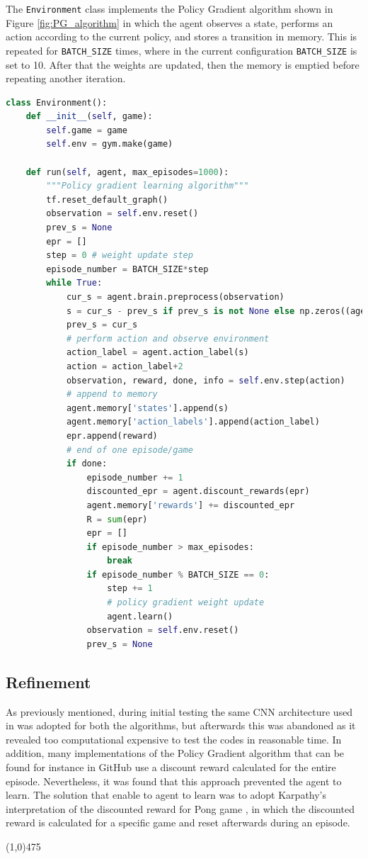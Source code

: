 \documentclass[a4paper, 11pt]{article}
\newcommand{\hl}{\begin{center} \line(1,0){475} \end{center}} %
\begin{document}
The \texttt{Environment} class implements the Policy Gradient algorithm shown in Figure \ref{fig:PG_algorithm} in which the agent observes a state, performs an action according to the current policy, and stores a transition in memory. This is repeated for \texttt{BATCH\_SIZE} times, where in the current configuration \texttt{BATCH\_SIZE} is set to 10. After that the weights are updated, then the memory is emptied before repeating another iteration.
\begin{lstlisting}[language=Python, caption=Policy Gradient Brain definition, label={lst:PG-brain}]
class Environment():
    def __init__(self, game):
        self.game = game
        self.env = gym.make(game)
        
    def run(self, agent, max_episodes=1000):
        """Policy gradient learning algorithm"""
        tf.reset_default_graph()
        observation = self.env.reset()
        prev_s = None
        epr = []
        step = 0 # weight update step
        episode_number = BATCH_SIZE*step       
        while True:            
            cur_s = agent.brain.preprocess(observation)
            s = cur_s - prev_s if prev_s is not None else np.zeros((agent.stateCnt))
            prev_s = cur_s
            # perform action and observe environment
            action_label = agent.action_label(s)
            action = action_label+2
            observation, reward, done, info = self.env.step(action)
            # append to memory
            agent.memory['states'].append(s)
            agent.memory['action_labels'].append(action_label)
            epr.append(reward)
            # end of one episode/game
            if done:
                episode_number += 1
                discounted_epr = agent.discount_rewards(epr)                
                agent.memory['rewards'] += discounted_epr
                R = sum(epr)         
                epr = [] 
                if episode_number > max_episodes:
                    break 
                if episode_number % BATCH_SIZE == 0:
                    step += 1
                    # policy gradient weight update    
                    agent.learn()                  
                observation = self.env.reset()
                prev_s = None
\end{lstlisting}

\subsection{Refinement}
As previously mentioned, during initial testing the same CNN architecture used in \cite{Mnih2015} was adopted for both the algorithms, but afterwards this was abandoned as it revealed too computational expensive to test the codes in reasonable time. In addition, many implementations of the Policy Gradient algorithm that can be found for instance in GitHub use a discount reward calculated for the entire episode. Nevertheless, it was found that this approach prevented the agent to learn. The solution that enable to agent to learn was to adopt Karpathy's interpretation of the discounted reward for Pong game \cite{Karpathy}, in which the discounted reward is calculated for a specific game and reset afterwards during an episode. 
\hl
\end{document}
